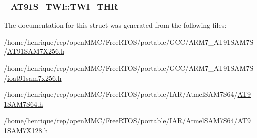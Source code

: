 \hypertarget{struct__AT91S__TWI_aac667223a3075b6c0656477f524d8552}{
\subsubsection[{T\-W\-I\-\_\-\-T\-H\-R}]{ \-\_\-\-A\-T91\-S\-\_\-\-T\-W\-I\-::\-T\-W\-I\-\_\-\-T\-H\-R}}\label{struct__AT91S__TWI_aac667223a3075b6c0656477f524d8552}


The documentation for this struct was generated from the following files\-:\begin{DoxyCompactItemize}
\item 
/home/henrique/rep/open\-M\-M\-C/\-Free\-R\-T\-O\-S/portable/\-G\-C\-C/\-A\-R\-M7\-\_\-\-A\-T91\-S\-A\-M7\-S/\hyperlink{GCC_2ARM7__AT91SAM7S_2AT91SAM7X256_8h}{A\-T91\-S\-A\-M7\-X256.\-h}\item 
/home/henrique/rep/open\-M\-M\-C/\-Free\-R\-T\-O\-S/portable/\-G\-C\-C/\-A\-R\-M7\-\_\-\-A\-T91\-S\-A\-M7\-S/\hyperlink{ioat91sam7x256_8h}{ioat91sam7x256.\-h}\item 
/home/henrique/rep/open\-M\-M\-C/\-Free\-R\-T\-O\-S/portable/\-I\-A\-R/\-Atmel\-S\-A\-M7\-S64/\hyperlink{AT91SAM7S64_8h}{A\-T91\-S\-A\-M7\-S64.\-h}\item 
/home/henrique/rep/open\-M\-M\-C/\-Free\-R\-T\-O\-S/portable/\-I\-A\-R/\-Atmel\-S\-A\-M7\-S64/\hyperlink{AT91SAM7X128_8h}{A\-T91\-S\-A\-M7\-X128.\-h}\end{DoxyCompactItemize}

